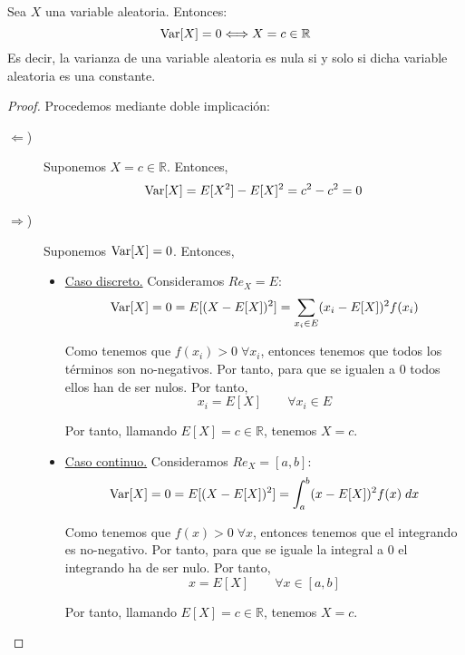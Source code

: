 \begin{prop}\label{prop:6.13}
    Sea $X$ una variable aleatoria. Entonces:
    \begin{equation*}
        \operatorname{Var}[X]=0 \Longleftrightarrow X=c\in \mathbb{R}
    \end{equation*}
    Es decir, la varianza de una variable aleatoria es nula si y solo si dicha variable aleatoria es una constante.
\end{prop}
\begin{proof}
    Procedemos mediante doble implicación:
    \begin{description}
        \item [$\Longleftarrow$)] Suponemos $X=c\in \mathbb{R}$. Entonces,
        \begin{equation*}
            \operatorname{Var}[X] = E[X^2]-E[X]^2 = c^2 -c^2 = 0
        \end{equation*}

        \item [$\Longrightarrow$)] Suponemos $\operatorname{Var}[X]=0$. Entonces,
        \begin{itemize}
            \item \underline{Caso discreto.} Consideramos $Re_X = E$:
            \begin{equation*}
                \operatorname{Var}[X] = 0 = E[(X-E[X])^2]
                = \sum_{x_i\in E}(x_i-E[X])^2 f(x_i)
            \end{equation*}

            Como tenemos que $f(x_i)> 0\;\forall x_i$, entonces tenemos que todos los términos son no-negativos. Por tanto, para que se igualen a $0$ todos ellos han de ser nulos. Por tanto,
            \begin{equation*}
                x_i = E[X] \qquad \forall x_i \in E
            \end{equation*}

            Por tanto, llamando $E[X]=c\in \mathbb{R}$, tenemos $X=c$.



            \item \underline{Caso continuo.} Consideramos $Re_X = [a,b]$:
            \begin{equation*}
                \operatorname{Var}[X] = 0 = E[(X-E[X])^2]
                = \int_a^b (x-E[X])^2 f(x)\;dx
            \end{equation*}

            Como tenemos que $f(x)> 0\;\forall x$, entonces tenemos que el integrando es no-negativo. Por tanto, para que se iguale la integral a $0$ el integrando ha de ser nulo. Por tanto,
            \begin{equation*}
                x = E[X] \qquad \forall x \in [a,b]
            \end{equation*}

            Por tanto, llamando $E[X]=c\in \mathbb{R}$, tenemos $X=c$.
        \end{itemize}
    \end{description}
\end{proof}

